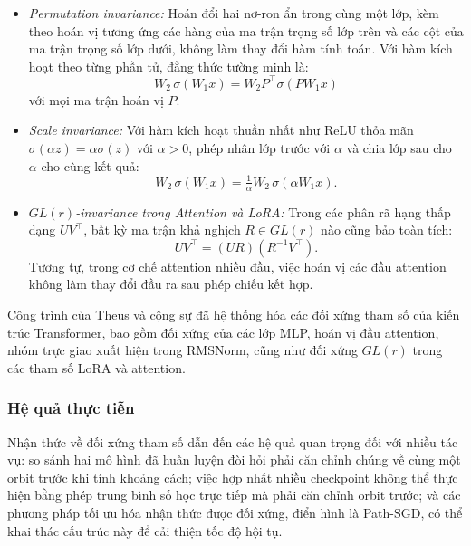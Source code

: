 \begin{itemize}
    \item \textit{Permutation invariance:} Hoán đổi hai nơ-ron ẩn trong cùng một lớp, kèm theo hoán vị tương ứng các hàng của ma trận trọng số lớp trên và các cột của ma trận trọng số lớp dưới, không làm thay đổi hàm tính toán. Với hàm kích hoạt theo từng phần tử, đẳng thức tường minh là:
    \begin{equation}
        W_2\, \sigma(W_1 x) = W_2 P^\top \sigma(P W_1 x)
    \end{equation}
    với mọi ma trận hoán vị $P$.

    \item \textit{Scale invariance:} Với hàm kích hoạt thuần nhất như ReLU thỏa mãn $\sigma(\alpha z) = \alpha \sigma(z)$ với $\alpha > 0$, phép nhân lớp trước với $\alpha$ và chia lớp sau cho $\alpha$ cho cùng kết quả:
    \begin{equation}
        W_2\, \sigma(W_1 x) = \tfrac{1}{\alpha} W_2\, \sigma(\alpha W_1 x).
    \end{equation}

    \item \textit{$GL(r)$-invariance trong Attention và LoRA:} Trong các phân rã hạng thấp dạng $UV^\top$, bất kỳ ma trận khả nghịch $R \in GL(r)$ nào cũng bảo toàn tích:
    \begin{equation}
        UV^\top = (UR)(R^{-1}V^\top).
    \end{equation}
    Tương tự, trong cơ chế attention nhiều đầu, việc hoán vị các đầu attention không làm thay đổi đầu ra sau phép chiếu kết hợp.
\end{itemize}

Công trình của Theus và cộng sự \cite{theus2025transformers} đã hệ thống hóa các đối xứng tham số của kiến trúc Transformer, bao gồm đối xứng của các lớp MLP, hoán vị đầu attention, nhóm trực giao xuất hiện trong RMSNorm, cũng như đối xứng $GL(r)$ trong các tham số LoRA và attention.

\subsubsection{Hệ quả thực tiễn}

Nhận thức về đối xứng tham số dẫn đến các hệ quả quan trọng đối với nhiều tác vụ: so sánh hai mô hình đã huấn luyện đòi hỏi phải căn chỉnh chúng về cùng một orbit trước khi tính khoảng cách; việc hợp nhất nhiều checkpoint không thể thực hiện bằng phép trung bình số học trực tiếp mà phải căn chỉnh orbit trước; và các phương pháp tối ưu hóa nhận thức được đối xứng, điển hình là Path-SGD, có thể khai thác cấu trúc này để cải thiện tốc độ hội tụ.

